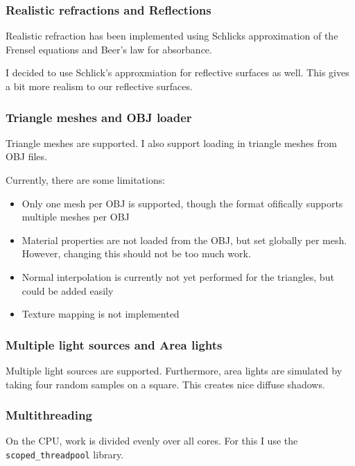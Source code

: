 \documentclass{article}
\begin{document}
\subsubsection{Realistic refractions and Reflections}
Realistic refraction has been implemented using Schlicks approximation of the Frensel equations
and Beer's law for absorbance.

I decided to use Schlick's approxmiation for reflective surfaces as well. This gives a bit more realism to
our reflective surfaces.

\subsubsection{Triangle meshes and OBJ loader}
Triangle meshes are supported. I also support loading in triangle meshes from OBJ files.

Currently, there are some limitations:
\begin{itemize}
  \item Only one mesh per OBJ is supported, though the format ofifically supports multiple meshes per OBJ
  \item Material properties are not loaded from the OBJ, but set globally per
    mesh. However, changing this should not be too much work.
  \item Normal interpolation is currently not yet performed for the triangles, but could be added easily
  \item Texture mapping is not implemented
\end{itemize}

\subsubsection{Multiple light sources and Area lights}
Multiple light sources are supported. Furthermore, area lights are simulated
by taking four random samples on a square. This creates nice diffuse shadows.

\subsubsection{Multithreading}
On the CPU, work is divided evenly over all cores. For this I use the \texttt{scoped\_threadpool} library.
\end{document}
